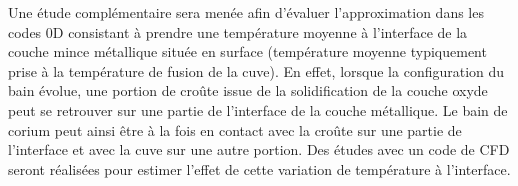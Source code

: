 Une étude complémentaire sera menée afin d'évaluer l'approximation dans les codes 0D consistant à prendre une température moyenne à l'interface de la couche mince métallique située en surface (température moyenne typiquement prise à la température de fusion de la cuve). En effet, lorsque la configuration du bain évolue, une portion de croûte issue de la solidification de la couche oxyde peut se retrouver sur une partie de l'interface de la couche métallique. Le bain de corium peut ainsi être à la fois en contact avec la croûte sur une partie de l'interface et avec la cuve sur une autre portion. Des études avec un code de CFD seront réalisées pour estimer l'effet de cette variation de température à l'interface.
